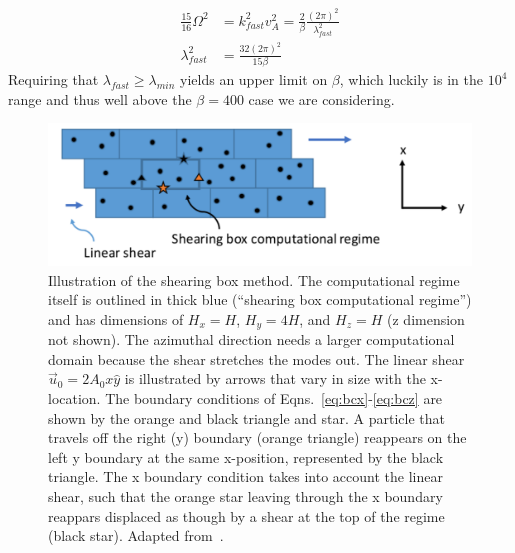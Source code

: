 \begin{align*}
  \frac{15}{16}\Omega^2&=k^2_{fast}v_A^2=\frac2\beta\frac{(2\pi)^2}{\lambda_{fast}^2}\\
  \lambda_{fast}^2&=\frac{32(2\pi)^2}{15\beta}
\end{align*}
Requiring that $\lambda_{fast}\ge\lambda_{min}$ yields an upper limit on $\beta$, which luckily is in the $10^4$ range and thus well above the $\beta=400$ case we are considering. 
\begin{figure}[h]
  \begin{center}  
    \includegraphics [width=\textwidth, angle=0.]{img/ShearingBox.pdf}
  \end{center}
  \caption{Illustration of the shearing box method. The computational regime itself is outlined in thick blue (``shearing box computational regime'') and has dimensions of $H_x=H$, $H_y=4H$, and $H_z=H$ (z dimension not shown). The azimuthal direction needs a larger computational domain because the shear stretches the modes out. The linear shear $\vec u_0=2A_0x\hat y$ is illustrated by arrows that vary in size with the x-location. The boundary conditions of Eqns.~\ref{eq:bcx}-\ref{eq:bcz} are shown by the orange and black triangle and star. A particle that travels off the right (y) boundary (orange triangle) reappears on the left y boundary at the same x-position, represented by the black triangle. The x boundary condition takes into account the linear shear, such that the orange star leaving through the x boundary reappars displaced as though by a shear at the top of the regime (black star). Adapted from~.}
  \label{fig:shearingbox}
\end{figure}


